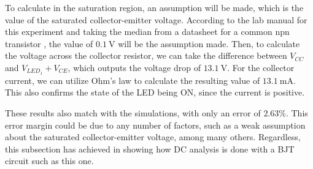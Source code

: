 \documentclass[11pt]{report}
\begin{document}
To calculate in the saturation region, an assumption will be made, which is the value of the saturated collector-emitter voltage. According to the lab manual for this experiment and taking the median from a datasheet for a common npn transistor \autocite{onsemiGeneralPurposeLow,Lab2BJT}, the value of $\SI{0.1}{\volt}$ will be the assumption made. Then, to calculate the voltage across the collector resistor, we can take the difference between $V_{CC}$ and $V_{LED_1} + V_{CE}$, which outputs the voltage drop of $\SI{13.1}{\volt}$. For the collector current, we can utilize Ohm's law to calculate the resulting value of $\SI{13.1}{\milli\ampere}$. This also confirms the state of the LED being ON, since the current is positive.

These results also match with the simulations, with only an error of $2.63\%$. This error margin could be due to any number of factors, such as a weak assumption about the saturated collector-emitter voltage, among many others. Regardless, this subsection has achieved in showing how DC analysis is done with a BJT circuit such as this one.
\end{document}

